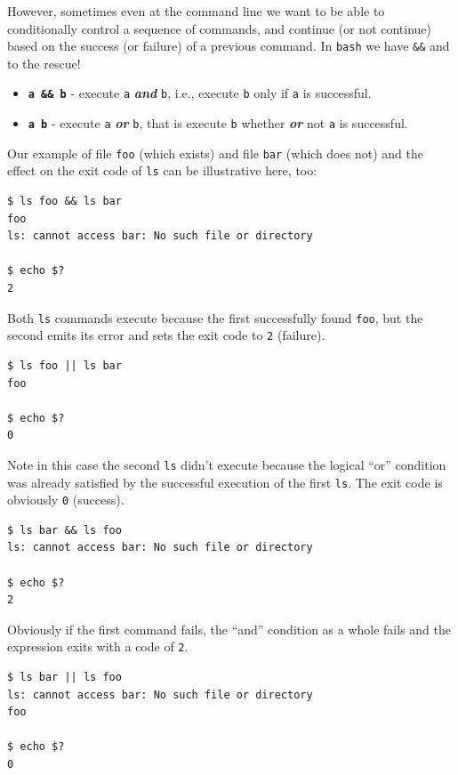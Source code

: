 \documentclass[10pt,]{book}
\numberwithin{figure}{chapter}
\begin{document}
However, sometimes even at the command line we want to be able to
conditionally control a sequence of commands, and continue (or not
continue) based on the success (or failure) of a previous command. In
\texttt{bash} we have \texttt{\&\&} and \texttt{\textbar{}\textbar{}} to
the rescue!

\begin{itemize}
\item
  \textbf{\texttt{a \&\& b}} - execute \texttt{a} \textbf{\emph{and}}
  \texttt{b}, i.e., execute \texttt{b} only if \texttt{a} is successful.
\item
  \textbf{\texttt{a \textbar{}\textbar{} b}} - execute \texttt{a}
  \textbf{\emph{or}} \texttt{b}, that is execute \texttt{b} whether
  \textbf{\emph{or}} not \texttt{a} is successful.
\end{itemize}

Our example of file \texttt{foo} (which exists) and file \texttt{bar}
(which does not) and the effect on the exit code of \texttt{ls} can be
illustrative here, too:

\begin{verbatim}
$ ls foo && ls bar
foo
ls: cannot access bar: No such file or directory

$ echo $?
2
\end{verbatim}

Both \texttt{ls} commands execute because the first successfully found
\texttt{foo}, but the second emits its error and sets the exit code to
\texttt{2} (failure).

\begin{verbatim}
$ ls foo || ls bar
foo

$ echo $?
0
\end{verbatim}

Note in this case the second \texttt{ls} didn't execute because the
logical ``or'' condition was already satisfied by the successful
execution of the first \texttt{ls}. The exit code is obviously
\texttt{0} (success).

\begin{verbatim}
$ ls bar && ls foo
ls: cannot access bar: No such file or directory

$ echo $?
2
\end{verbatim}

Obviously if the first command fails, the ``and'' condition as a whole
fails and the expression exits with a code of \texttt{2}.

\begin{verbatim}
$ ls bar || ls foo
ls: cannot access bar: No such file or directory
foo

$ echo $?
0
\end{verbatim}
\end{document}
